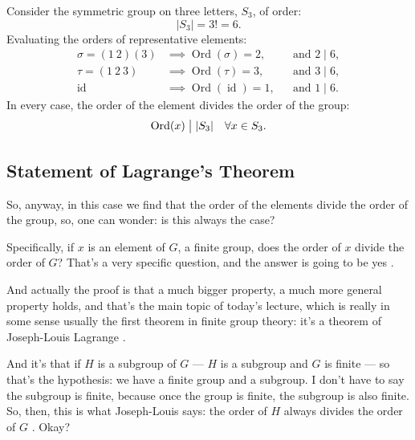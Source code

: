 \begin{content}
Consider the symmetric group on three letters, $S_3$, of order:
\[
|S_3| = 3! = 6.
\]
Evaluating the orders of representative elements:
\begin{align*}
\sigma = (1\ 2)(3) &\implies \operatorname{Ord}(\sigma) = 2, && \text{and } 2 \mid 6, \\
\tau = (1\ 2\ 3) &\implies \operatorname{Ord}(\tau) = 3, && \text{and } 3 \mid 6, \\
\operatorname{id} &\implies \operatorname{Ord}(\operatorname{id}) = 1, && \text{and } 1 \mid 6.
\end{align*}
In every case, the order of the element divides the order of the group:
\[
\operatorname{Ord}(x) \bigm| |S_3| \quad \forall x \in S_3.
\]
\end{content}

\subsection{Statement of Lagrange's Theorem}

\begin{speech}[00:09:18 - 00:10:50]
So, anyway, in this case we find that the order of the elements divide the order of the group, so, one can wonder: is this always the case? 

Specifically, if $x$ is an element of $G$, a finite group, does the order of $x$ divide the order of $G$?  That's a very specific question, and the answer is going to be yes .

And actually the proof is that a much bigger property, a much more general property holds, and that's the main topic of today's lecture, which is really in some sense usually the first theorem in finite group theory: it's a theorem of Joseph-Louis Lagrange .

And it's that if $H$ is a subgroup of $G$ --- $H$ is a subgroup and $G$ is finite  --- so that's the hypothesis: we have a finite group and a subgroup. I don't have to say the subgroup is finite, because once the group is finite, the subgroup is also finite. So, then, this is what Joseph-Louis says: the order of $H$ always divides the order of $G$ . Okay?
\end{speech}

